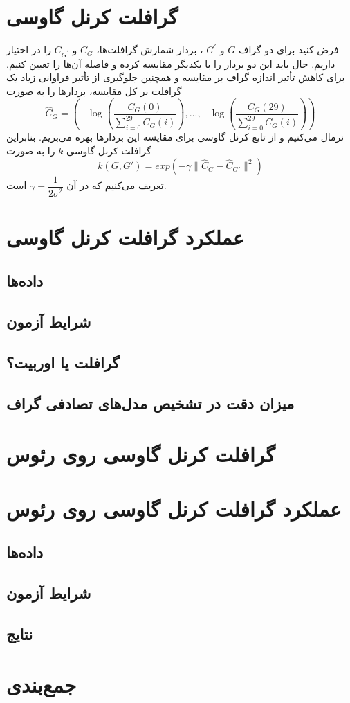 \section{گرافلت کرنل گاوسی}
فرض کنید برای دو گراف $G$ و $G^\prime$ ، بردار شمارش گرافلت‌ها، $C_G$ و $C_{G^\prime}$ را در اختیار داریم. حال باید این دو بردار را با یکدیگر مقایسه کرده و فاصله آن‌ها را تعیین کنیم. برای کاهش تأثیر اندازه گراف‌ بر مقایسه و همچنین جلوگیری از تأثیر فراوانی زیاد یک گرافلت بر کل مقایسه، بردارها را به صورت
\begin{equation}
\label{eq:feature-vector}
\hat{C}_G = (-\log(\dfrac{C_G(0)}{\sum _{i=0}^{29} C_G(i)}),...,-\log(\dfrac{C_G(29)}{\sum _{i=0}^{29} C_G(i)}))
\end{equation}
نرمال می‌کنیم و از تابع کرنل گاوسی برای مقایسه این بردارها بهره می‌بریم. بنابراین گرافلت کرنل گاوسی $k$ را به صورت
\begin{equation}
\label{eqn:kernelfunction}
k(G,G') = exp(-\gamma\parallel \hat{C}_G - \hat{C}_{G'}\parallel^2)
\end{equation}
تعریف می‌کنیم که در آن $\gamma = \dfrac{1}{2\sigma^2}$ است.

\section{عملکرد گرافلت کرنل گاوسی}
\subsection{داده‌‌ها}
\subsection{شرایط آزمون}
\subsection{گرافلت یا اوربیت؟}\label{sec:graphlet-vs-orbit}
\subsection{میزان دقت در تشخیص مدل‌های تصادفی گراف}

\section{گرافلت کرنل گاوسی روی رئوس}
\section{عملکرد گرافلت کرنل گاوسی روی رئوس}
\subsection{داده‌ها}
\subsection{شرایط آزمون}
\subsection{نتایج}

\section{جمع‌بندی}